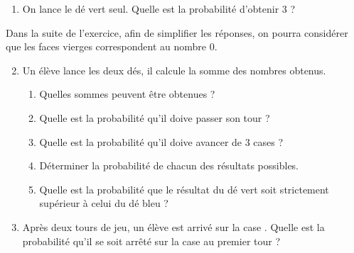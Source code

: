 \begin{exercice}
\begin{enumerate}
      \item On lance le dé vert seul. Quelle est la probabilité d’obtenir 3 ? \\ [-8mm]
   \end{enumerate}
   Dans la suite de l’exercice, afin de simplifier les réponses, on pourra considérer que les faces vierges correspondent au nombre 0. \medskip
   \begin{enumerate}
      \setcounter{enumi}{1}
      \item Un élève lance les deux dés, il calcule la somme des nombres obtenus.
         \begin{enumerate}
            \item Quelles sommes peuvent être obtenues ?
            \item Quelle est la probabilité qu’il doive passer son tour ?
            \item Quelle est la probabilité qu’il doive avancer de 3 cases ?
            \item  Déterminer la probabilité de chacun des résultats possibles.
            \item Quelle est la probabilité que le résultat du dé vert soit strictement supérieur à celui du dé bleu ?
         \end{enumerate}
      \item Après deux tours de jeu, un élève est arrivé sur la case . Quelle est la probabilité qu'il se soit arrêté sur la case  au premier tour ?
   \end{enumerate}
\end{exercice}

